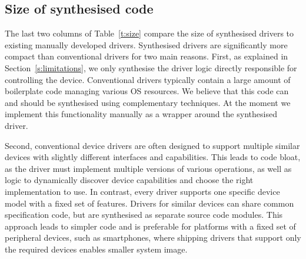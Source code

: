 
\subsection{Size of synthesised code} 
The last two columns of Table~\ref{t:size} compare the size of synthesised drivers to existing manually developed drivers.  Synthesised drivers are significantly more compact than conventional drivers for two main reasons.  First, as explained in Section~\ref{s:limitations}, we only synthesise the driver logic directly responsible for controlling the device.  Conventional drivers typically contain a large amount of boilerplate code managing various OS resources.  We believe that this code can and should be synthesised using complementary techniques.  At the moment we implement this functionality manually as a wrapper around the synthesised driver. 

Second, conventional device drivers are often designed to support multiple similar devices with slightly different interfaces and capabilities.  This leads to code bloat, as the driver must implement multiple versions of various operations, as well as logic to dynamically discover device capabilities and choose the right implementation to use.  In contrast, every \termite driver supports one specific device model with a fixed set of features.  Drivers for similar devices can share common specification code, but are synthesised as separate source code modules.  This approach leads to simpler code and is preferable for platforms with a fixed set of peripheral devices, such as smartphones, where shipping drivers that support only the required devices enables smaller system image.
  
